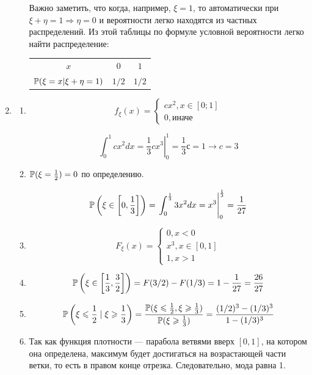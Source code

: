 \begin{enumerate}
\begin{enumerate}
Важно заметить, что когда, например, $\xi = 1$, то автоматически при
$\xi + \eta  = 1 \Rightarrow \eta = 0$ и вероятности легко находятся из частных распределений.
Из этой таблицы по формуле условной вероятности легко найти распределение:


\begin{center}
\begin{tabular}{ccc}
\toprule
$x$ & $0$ & $1$ \\
$\P(\xi = x | \xi + \eta = 1)$ & $1/2$ & $1/2$ \\ 
\bottomrule
\end{tabular}
\end{center}
\end{enumerate}

\item
\begin{enumerate}
\item
\[
f_\xi(x) =
\begin{cases}
cx^2 , x \in [0;1] \\
0 , \text{иначе}
\end{cases}
\]

\[
\int_{0}^{1}cx^2 dx= \left. \frac{1}{3}c x^3 \right|_0^1 = \frac{1}{3} с = 1 \to c = 3
\]

\item
$\P(\xi = \frac{1}{2}) = 0$ по определению.

\[
\P\left(\xi \in \left[0, \frac{1}{3}\right]\right) = \left. \int_{0}^{\frac{1}{3}} 3x^2 dx = x^3 \right|_0^{\frac{1}{3}}  = \frac{1}{27}
\]
\item
\[
F_\xi(x) =
\begin{cases}
0, x < 0\\
x^3, x \in [0, 1]\\
1, x > 1
\end{cases}
\]

\item
\[
  \P\left(\xi \in \left[\frac{1}{3}, \frac{3}{2}\right]\right) = F(3/2) - F(1/3) = 1 - \frac{1}{27} = \frac{26}{27}
\]
\item
\[
	\P\left(\xi \le \frac{1}{2} \mid  \xi \ge \frac{1}{3}\right) = \frac{\P(\xi \le \frac{1}{2} ,  \xi \ge \frac{1}{3})}{\P(\xi \ge \frac{1}{3})} = \frac{(1/2)^3 - (1/3)^3}{1 - (1/3)^3}
\]


\item
Так как функция плотности — парабола ветвями вверх $[0, 1]$, на котором она определена,
максимум будет достигаться на возрастающей части ветки, то есть в правом конце отрезка.
Следовательно, мода равна 1.



\end{enumerate}
\end{enumerate}
